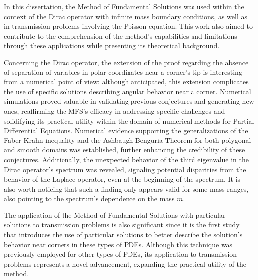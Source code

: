 \label{chap:conclusion}

In this dissertation, the Method of Fundamental Solutions was used within the context of the Dirac operator with infinite mass boundary conditions, as well as in transmission problems involving the Poisson equation. This work also aimed to contribute to the comprehension of the method's capabilities and limitations through these applications while presenting its theoretical background.

Concerning the Dirac operator, the extension of the proof regarding the absence of separation of variables in polar coordinates near a corner's tip is interesting from a numerical point of view: although anticipated, this extension complicates the use of specific solutions describing angular behavior near a corner. Numerical simulations proved valuable in validating previous conjectures and generating new ones, reaffirming the \ac{MFS}'s efficacy in addressing specific challenges and solidifying its practical utility within the domain of numerical methods for Partial Differential Equations. Numerical evidence supporting the generalizations of the Faber-Krahn inequality and the Ashbaugh-Benguria Theorem for both polygonal and smooth domains was established, further enhancing the credibility of these conjectures. Additionally, the unexpected behavior of the third eigenvalue in the Dirac operator's spectrum was revealed, signaling potential disparities from the behavior of the Laplace operator, even at the beginning of the spectrum. It is also worth noticing that such a finding only appears valid for some mass ranges, also pointing to the spectrum's dependence on the mass \(m\).

The application of the Method of Fundamental Solutions with particular solutions to transmission problems is also significant since it is the first study that introduces the use of particular solutions to better describe the solution's behavior near corners in these types of \acp{PDE}. Although this technique was previously employed for other types of \acp{PDE}, its application to transmission problems represents a novel advancement, expanding the practical utility of the method.

